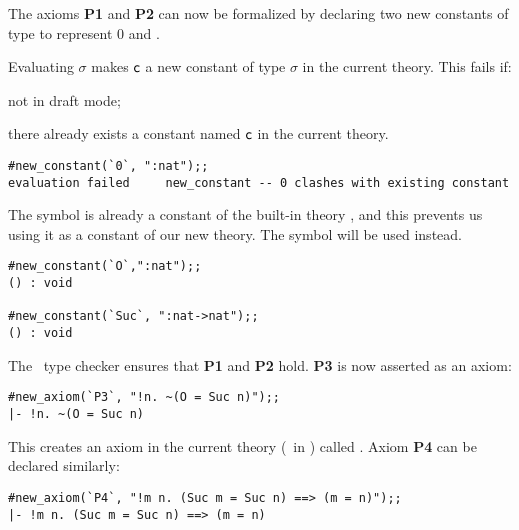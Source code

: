 The axioms {\small\bf P1} and {\small\bf P2} can now be formalized by declaring
two new constants of type 
to represent $0$ and \Suc.

Evaluating $\sigma$\ml{)} makes
${\sf c}$ a new constant of type $\sigma$ in the current theory.
This fails if:

\begin{myenumerate}
\item not in draft mode;
\item there already exists a constant named ${\sf c}$ in the current
theory.
\end{myenumerate}

\begin{session}\begin{verbatim}
#new_constant(`0`, ":nat");;
evaluation failed     new_constant -- 0 clashes with existing constant
\end{verbatim}\end{session}


The symbol 
is already a constant of the built-in theory , and this prevents
us using it as a constant of our new theory. The symbol  will be used
instead.

\begin{session}\begin{verbatim}
#new_constant(`O`,":nat");;
() : void

#new_constant(`Suc`, ":nat->nat");;
() : void
\end{verbatim}\end{session}



The \HOL\ type checker ensures that {\small\bf P1} and {\small\bf P2} hold.
{\small\bf P3} is now asserted as an axiom:

\begin{session}\begin{verbatim}
#new_axiom(`P3`, "!n. ~(O = Suc n)");;
|- !n. ~(O = Suc n)
\end{verbatim}\end{session}

\noindent This creates an axiom in the current theory (\ie\ in ) called
. Axiom {\small\bf P4} can be declared similarly:


\begin{session}\begin{verbatim}
#new_axiom(`P4`, "!m n. (Suc m = Suc n) ==> (m = n)");;
|- !m n. (Suc m = Suc n) ==> (m = n)
\end{verbatim}\end{session}

